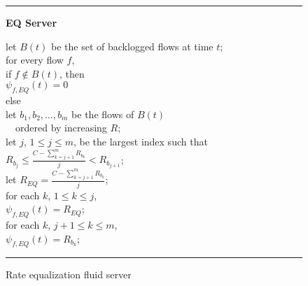 \begin{figure}
\noindent
\rule{\columnwidth}{0.5mm}
\centerline{\bf EQ Server}
\begin{tabbing}
\settabs
let $B(t)$ be the set of backlogged flows at time $t$;\\
for every flow $f$, \\
\tea if $f \notin B(t)$, then\\
\teb     $\psi_{f,EQ}(t) = 0$\\
\tea else\\
\teb     let $b_1,b_2,\ldots,b_m$ be the flows of $B(t)$\\
\teb     \ \ ordered by increasing $R$;\\
\teb     let $j$, $1\leq j \leq m$, be the largest index such that\\
\tec          $\displaystyle R_{b_j} \leq
                                 \frac{C - \sum_{k=j+1}^{m}R_{b_k}}{j}
                           < R_{b_{j+1}}$;\\
\teb     let $\displaystyle R_{EQ} = \frac{C - 
\sum_{k=j+1}^{m}R_{b_k}}{j}$;\\
\teb     for each $k$, $1 \leq k \leq j$, \\
\tec          $\psi_{f,EQ}(t) = R_{EQ}$;\\
\teb     for each $k$, $j+1 \leq k \leq m$,\\
\tec          $\psi_{f,EQ}(t) = R_{b_k}$;

\end{tabbing}
\caption{Rate equalization fluid server}
\rule{\columnwidth}{0.5mm}
\label{fig:EQ-server}
\end{figure}

